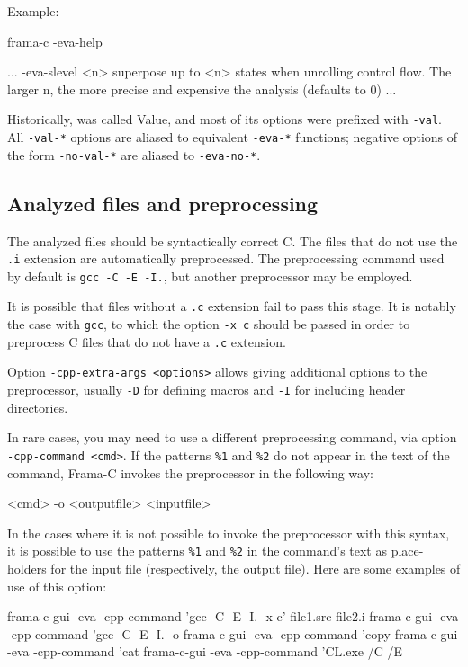 \documentclass{frama-c-book}
\begin{document}
Example:
\begin{frama-c-commands}
frama-c -eva-help
\end{frama-c-commands}
\begin{logsmath}
...
-eva-slevel <n>     superpose up to <n> states when unrolling control flow.
                    The larger n, the more precise and expensive the analysis
                    (defaults to 0)
...
\end{logsmath}

\begin{important}
  Historically, \Eva{} was called Value, and most of its options
  were prefixed with \lstinline|-val|. All \lstinline|-val-*| options
  are aliased to equivalent \lstinline|-eva-*| functions; negative options of
  the form \lstinline|-no-val-*| are aliased to \lstinline|-eva-no-*|.
\end{important}

\subsection{Analyzed files and preprocessing}\label{sec:analyz-files-prepr}

The analyzed files should be syntactically correct C. The files
that do not use the {\tt .i} extension are automatically
preprocessed. The preprocessing command used by default is
\lstinline|gcc -C -E -I.|, but another preprocessor may be employed.

It is possible that files without a {\tt .c} extension
fail to pass this stage. It is notably the case with \lstinline|gcc|,
to which the option \lstinline|-x c| should be passed in order to preprocess
C files that do not have a \lstinline|.c| extension.
\goodbreak

Option \lstinline|-cpp-extra-args <options>| allows giving additional options
to the preprocessor, usually \verb|-D| for defining macros and \verb|-I| for
including header directories.

In rare cases, you may need to use a different preprocessing command, via
option \lstinline|-cpp-command <cmd>|.
If the patterns \lstinline|%1| and \lstinline|%2| do not appear
in the text of the
command, Frama-C invokes the preprocessor in the following way:
\begin{frama-c-commands}
<cmd> -o <outputfile> <inputfile>
\end{frama-c-commands}

In the cases where it is not possible to invoke the preprocessor with
this syntax, it is possible to use the
patterns \lstinline|%1| and \lstinline|%2|
in the command's text as place-holders for the input file (respectively,
the output file). Here are some examples of use of this option:
\begin{frama-c-commands}
frama-c-gui -eva -cpp-command 'gcc -C -E -I. -x c' file1.src file2.i
frama-c-gui -eva -cpp-command 'gcc -C -E -I. -o %
frama-c-gui -eva -cpp-command 'copy %
frama-c-gui -eva -cpp-command 'cat %
frama-c-gui -eva -cpp-command 'CL.exe /C /E %
\end{frama-c-commands}
\end{document}
